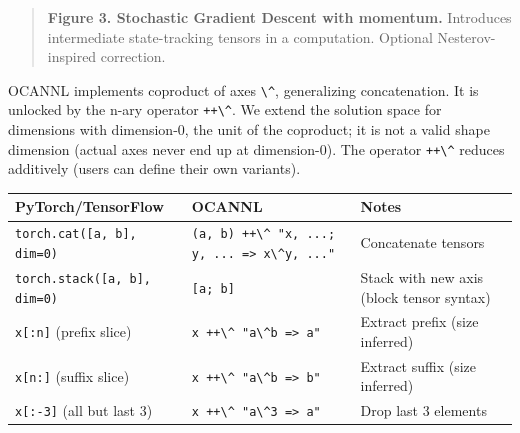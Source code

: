 \documentclass[
  10pt,
  letterpaper,
]{article}
\newcommand{\passthrough}[1]{#1}
\begin{document}
\begin{quote}
\textbf{Figure 3. Stochastic Gradient Descent with momentum.} Introduces
intermediate state-tracking tensors in a computation. Optional
Nesterov-inspired correction.
\end{quote}

OCANNL implements coproduct of axes \passthrough{\lstinline!\^!},
generalizing concatenation. It is unlocked by the n-ary operator
\passthrough{\lstinline!++\^!}. We extend the solution space for
dimensions with dimension-0, the unit of the coproduct; it is not a
valid shape dimension (actual axes never end up at dimension-0). The
operator \passthrough{\lstinline!++\^!} reduces additively (users can
define their own variants).

\begin{longtable}[]{@{}
  >{\raggedright\arraybackslash}p{}
  >{\raggedright\arraybackslash}p{}
  >{\raggedright\arraybackslash}p{}@{}}
\toprule\noalign{}
\begin{minipage}[b]{\linewidth}\raggedright
PyTorch/TensorFlow
\end{minipage} & \begin{minipage}[b]{\linewidth}\raggedright
OCANNL
\end{minipage} & \begin{minipage}[b]{\linewidth}\raggedright
Notes
\end{minipage} \\
\midrule\noalign{}
\endhead
\bottomrule\noalign{}
\endlastfoot
\passthrough{\lstinline!torch.cat([a, b], dim=0)!} &
\passthrough{\lstinline!(a, b) ++\^ "x, ...; y, ... => x\^y, ..."!} &
Concatenate tensors \\
\passthrough{\lstinline!torch.stack([a, b], dim=0)!} &
\passthrough{\lstinline![a; b]!} & Stack with new axis (block tensor
syntax) \\
\passthrough{\lstinline!x[:n]!} (prefix slice) &
\passthrough{\lstinline!x ++\^ "a\^b => a"!} & Extract prefix (size
inferred) \\
\passthrough{\lstinline!x[n:]!} (suffix slice) &
\passthrough{\lstinline!x ++\^ "a\^b => b"!} & Extract suffix (size
inferred) \\
\passthrough{\lstinline!x[:-3]!} (all but last 3) &
\passthrough{\lstinline!x ++\^ "a\^3 => a"!} & Drop last 3 elements \\
\end{longtable}
\end{document}
